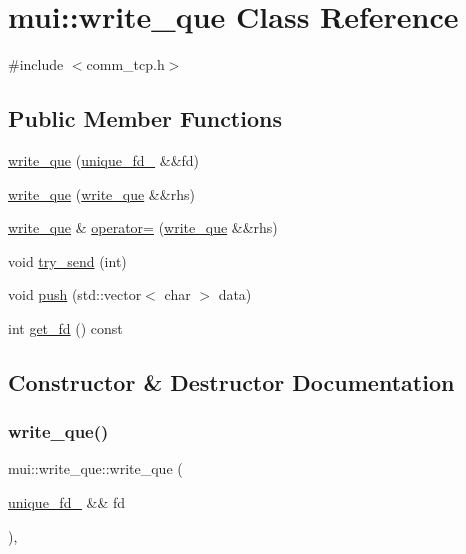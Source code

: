 \hypertarget{classmui_1_1write__que}{}\section{mui\+:\+:write\+\_\+que Class Reference}
\label{classmui_1_1write__que}


{\ttfamily \#include $<$comm\+\_\+tcp.\+h$>$}

\subsection*{Public Member Functions}
\begin{DoxyCompactItemize}
\item 
\hyperlink{classmui_1_1write__que_a918b54d9b9652c765e86dec9a41504e4}{write\+\_\+que} (\hyperlink{classmui_1_1unique__fd__}{unique\+\_\+fd\+\_\+} \&\&fd)
\item 
\hyperlink{classmui_1_1write__que_a6d5f8899f6816de6b37bb555501d7ede}{write\+\_\+que} (\hyperlink{classmui_1_1write__que}{write\+\_\+que} \&\&rhs)
\item 
\hyperlink{classmui_1_1write__que}{write\+\_\+que} \& \hyperlink{classmui_1_1write__que_a81fe7b2b456cb72299228d871b822a44}{operator=} (\hyperlink{classmui_1_1write__que}{write\+\_\+que} \&\&rhs)
\item 
void \hyperlink{classmui_1_1write__que_a5edaf16ea1bee75db17644deb983a374}{try\+\_\+send} (int)
\item 
void \hyperlink{classmui_1_1write__que_ada9cb8be7f83626720a977b063ea2471}{push} (std\+::vector$<$ char $>$ data)
\item 
int \hyperlink{classmui_1_1write__que_aa3faa6da78c6adae87d96e06454d98f3}{get\+\_\+fd} () const
\end{DoxyCompactItemize}


\subsection{Constructor \& Destructor Documentation}
\mbox{\label{classmui_1_1write__que_a918b54d9b9652c765e86dec9a41504e4}} 
\subsubsection{\texorpdfstring{write\+\_\+que()}{write\_que()}\hspace{0.1cm}{\footnotesize\ttfamily [1/2]}}
{\footnotesize\ttfamily mui\+::write\+\_\+que\+::write\+\_\+que (\begin{DoxyParamCaption}\item[{\hyperlink{classmui_1_1unique__fd__}{unique\+\_\+fd\+\_\+} \&\&}]{fd }\end{DoxyParamCaption})\hspace{0.3cm}{\ttfamily [inline]}, {\ttfamily [explicit]}}

